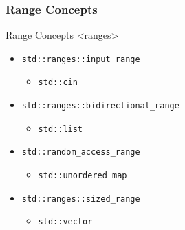 \subsubsection{Range Concepts}

\begin{frame}[fragile]{Range Concepts <ranges>}
    \begin{itemize}
        \item<1-> \texttt{std::ranges::input_range}
            \begin{itemize} \item \texttt{std::cin} \end{itemize}
        \item<2-> \texttt{std::ranges::bidirectional_range}
            \begin{itemize} \item \texttt{std::list} \end{itemize}
        \item<3-> \texttt{std::random_access_range}
            \begin{itemize} \item \texttt{std::unordered_map} \end{itemize}
        \item<4-> \texttt{std::ranges::sized_range}
            \begin{itemize} \item \texttt{std::vector} \end{itemize}
    \end{itemize}
\end{frame}


